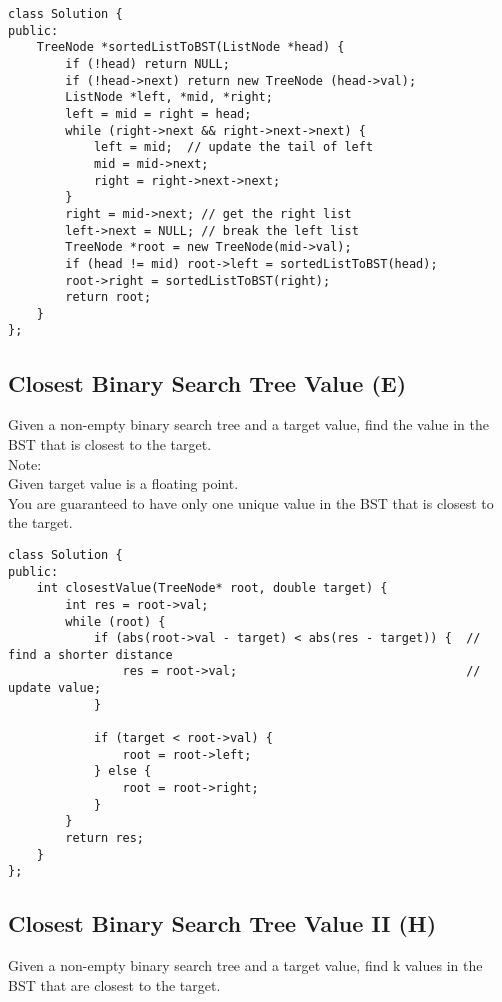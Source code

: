 \begin{lstlisting}
class Solution {
public:
    TreeNode *sortedListToBST(ListNode *head) {
        if (!head) return NULL;
        if (!head->next) return new TreeNode (head->val);
        ListNode *left, *mid, *right;
        left = mid = right = head;
        while (right->next && right->next->next) {
            left = mid;  // update the tail of left
            mid = mid->next;
            right = right->next->next;
        }
        right = mid->next; // get the right list
        left->next = NULL; // break the left list
        TreeNode *root = new TreeNode(mid->val);
        if (head != mid) root->left = sortedListToBST(head);
        root->right = sortedListToBST(right);
        return root;
    }
};
\end{lstlisting}


\subsection{Closest Binary Search Tree Value (E)}
Given a non-empty binary search tree and a target value, find the value in the BST that is closest to the target.\\

Note:\\
    Given target value is a floating point.\\
    You are guaranteed to have only one unique value in the BST that is closest to the target.\\

\begin{lstlisting}
class Solution {
public:
    int closestValue(TreeNode* root, double target) {
        int res = root->val;
        while (root) {
            if (abs(root->val - target) < abs(res - target)) {  // find a shorter distance
                res = root->val;                                // update value;
            }
            
            if (target < root->val) {
                root = root->left;
            } else {
                root = root->right;
            }
        }
        return res;
    }
};
\end{lstlisting}


\subsection{Closest Binary Search Tree Value II (H)}
Given a non-empty binary search tree and a target value, find k values in the BST that are closest to the target.\\

